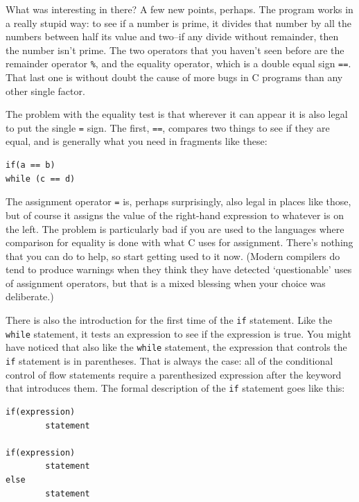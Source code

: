    What was interesting in there? A few new points, perhaps. The program
    works in a really stupid way: to see if a number is prime, it divides that
    number by all the numbers between half its value and two--if any
    divide without remainder, then the number isn't prime. The two operators
    that you haven't seen before are the remainder operator \texttt{\%},
    and the equality operator, which is a double equal sign \texttt{==}.
    That last one is without doubt the cause of more bugs in C programs than
    any other single factor.


   The problem with the equality test is that wherever it can appear it is
    also legal to put the single \texttt{=} sign. The first,
    \texttt{==}, compares two things to see if they are equal, and is
    generally what you need in fragments like these:


   \begin{Verbatim}
if(a == b)
while (c == d)
\end{Verbatim}

   The assignment operator \texttt{=} is, perhaps surprisingly, also
    legal in places like those, but of course it assigns the value of the
    right-hand expression to whatever is on the left. The problem is
    particularly bad if you are used to the languages where comparison for
    equality is done with what C uses for assignment. There's nothing that you
    can do to help, so start getting used to it now. (Modern compilers do tend
    to produce warnings when they think they have detected
    `questionable' uses of assignment operators, but that is a mixed
    blessing when your choice was deliberate.)


   There is also the introduction for the first time of the \texttt{if}
    statement. Like the \texttt{while} statement, it tests an expression
    to see if the expression is true. You might have noticed that also like
    the \texttt{while} statement, the expression that controls the
    \texttt{if} statement is in parentheses. That is always the case: all
    of the conditional control of flow statements require a parenthesized
    expression after the keyword that introduces them. The formal description
    of the \texttt{if} statement goes like this:


   \begin{Verbatim}
if(expression)
        statement

if(expression)
        statement
else
        statement
\end{Verbatim}

